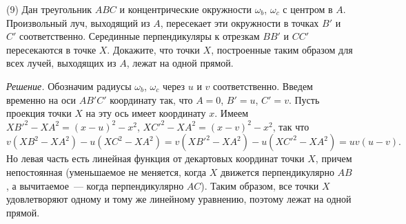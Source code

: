 \textsf{(9)}
Дан треугольник $ABC$ и концентрические окружности $\omega_b$, $\omega_c$ с
центром в $A$.
Произвольный луч, выходящий из $A$, пересекает эти окружности в точках $B'$ и
$C'$ соответственно.
Серединные перпендикуляры к отрезкам $BB'$ и $CC'$ пересекаются в точке $X$.
Докажите, что точки $X$, построенные таким образом для всех лучей, выходящих из
$A$, лежат на одной прямой.

\solution
\emph{Решение.}
Обозначим радиусы $\omega_b$, $\omega_c$ через $u$ и $v$ соответственно.
Введем временно на оси $AB'C'$ координату так, что $A = 0$, $B' = u$, $C' = v$.
Пусть проекция точки $X$ на эту ось имеет координату $x$.
Имеем
$XB'^2 - XA^2 = (x - u)^2 - x^2$,
$XC'^2 - XA^2 = (x - v)^2 - x^2$,
так что 
\[
    v (XB^2 - XA^2) - u (XC^2 - XA^2)
=
    v (XB'^2 - XA^2) - u (XC'^2 - XA^2)
=
    u v (u - v)
.\]
Но левая часть есть линейная функция от декартовых координат точки $X$, причем
непостоянная
(уменьшаемое не меняется, когда $X$ движется перпендикулярно $AB$, а
вычитаемое~--- когда перпендикулярно $AC$).
Таким образом, все точки $X$ удовлетворяют одному и тому же линейному
уравнению, поэтому лежат на одной прямой.

